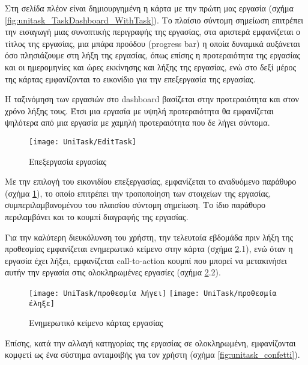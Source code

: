         Στη σελίδα πλέον είναι δημιουργημένη η κάρτα με την πρώτη μας εργασία (σχήμα \ref{fig:unitask_TaskDashboard_WithTask}). Το πλαίσιο {\Zona σύντομη σημείωση} επιτρέπει την εισαγωγή μιας συνοπτικής περιγραφής της εργασίας, στα αριστερά εμφανίζεται ο τίτλος της εργασίας, μια μπάρα προόδου (progress bar) η οποία δυναμικά αυξάνεται όσο πλησιάζουμε στη λήξη της εργασίας, όπως επίσης η προτεραιότητα της εργασίας και οι ημερομηνίες και ώρες εκκίνησης και λήξης της εργασίας, ενώ στο δεξί μέρος της κάρτας εμφανίζονται το εικονίδιο για την επεξεργασία της εργασίας.

        Η ταξινόμηση των εργασιών στο dashboard βασίζεται στην προτεραιότητα και στον χρόνο λήξης τους. Έτσι μια εργασία με υψηλή προτεραιότητα θα εμφανίζεται ψηλότερα από μια εργασία με χαμηλή προτεραιότητα που δε λήγει σύντομα.

        \begin{figure}[h!] \noindent \centering
            \texttt{[image: UniTask/EditTask]}
            \caption{\centering Επεξεργασία εργασίας}
            \label{fig:unitask_EditTask}
        \end{figure}

        Με την επιλογή του εικονιδίου επεξεργασίας, εμφανίζεται το αναδυόμενο παράθυρο (σχήμα \ref{fig:unitask_EditTask}), το οποίο επιτρέπει την τροποποίηση των στοιχείων της εργασίας, συμπεριλαμβανομένου του πλαισίου {\Zona σύντομη σημείωση}. Το ίδιο παράθυρο περιλαμβάνει και το κουμπί διαγραφής της εργασίας.

        Για την καλύτερη διευκόλυνση του χρήστη, την τελευταία εβδομάδα πριν λήξη της προθεσμίας εμφανίζεται ενημερωτικό κείμενο στην κάρτα (σχήμα \ref{fig:unitask_cardInfo}.1), ενώ όταν η εργασία έχει λήξει, εμφανίζεται call-to-action κουμπί που μπορεί να μετακινήσει αυτήν την εργασία στις ολοκληρωμένες εργασίες (σχήμα \ref{fig:unitask_cardInfo}.2).

        \begin{figure}[h!] \noindent \centering
            \texttt{[image: UniTask/προθεσμία λήγει]}
            \texttt{[image: UniTask/προθεσμία έληξε]}
            \caption{\centering Ενημερωτικό κείμενο κάρτας εργασίας}
            \label{fig:unitask_cardInfo}
        \end{figure}

        Επίσης, κατά την αλλαγή κατηγορίας της εργασίας σε ολοκληρωμένη, εμφανίζονται κομφετί ως ένα σύστημα ανταμοιβής για τον χρήστη (σχήμα \ref{fig:unitask_confetti}).


